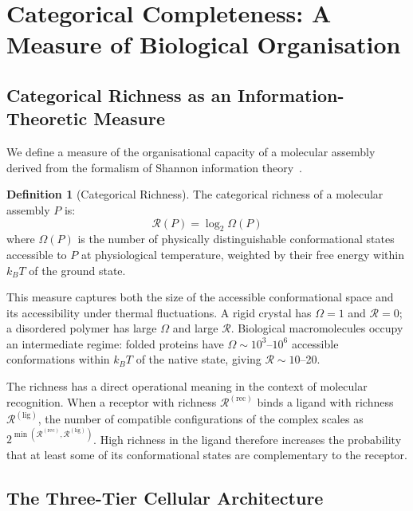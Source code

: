 \documentclass[12pt,a4paper]{article}
\theoremstyle{definition}
\newtheorem{definition}[theorem]{Definition}
\theoremstyle{remark}
\newcommand{\Rcat}{\mathcal{R}}
\begin{document}
\section{Categorical Completeness: A Measure of Biological Organisation}
\label{sec:categorical}

\subsection{Categorical Richness as an Information-Theoretic Measure}

We define a measure of the organisational capacity of a molecular assembly derived from the formalism of Shannon information theory~\cite{Shannon1948,Cover1991}.

\begin{definition}[Categorical Richness]
\label{def:richness}
The categorical richness of a molecular assembly $P$ is:
\begin{equation}
  \Rcat(P) = \log_2 \Omega(P)
  \label{eq:richness}
\end{equation}
where $\Omega(P)$ is the number of physically distinguishable conformational states accessible to $P$ at physiological temperature, weighted by their free energy within $k_BT$ of the ground state.
\end{definition}

This measure captures both the size of the accessible conformational space and its accessibility under thermal fluctuations. A rigid crystal has $\Omega = 1$ and $\Rcat = 0$; a disordered polymer has large $\Omega$ and large $\Rcat$. Biological macromolecules occupy an intermediate regime: folded proteins have $\Omega \sim 10^3$--$10^6$ accessible conformations within $k_BT$ of the native state, giving $\Rcat \sim 10$--20.

The richness has a direct operational meaning in the context of molecular recognition. When a receptor with richness $\Rcat^{(\mathrm{rec})}$ binds a ligand with richness $\Rcat^{(\mathrm{lig})}$, the number of compatible configurations of the complex scales as $2^{\min(\Rcat^{(\mathrm{rec})}, \Rcat^{(\mathrm{lig})})}$. High richness in the ligand therefore increases the probability that at least some of its conformational states are complementary to the receptor.

\subsection{The Three-Tier Cellular Architecture}
\end{document}
